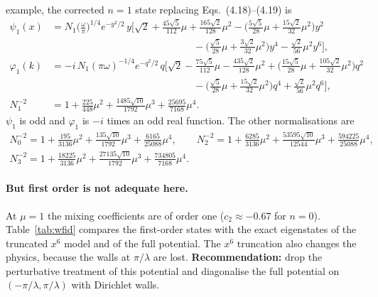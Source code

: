 \documentclass[11pt,a4paper]{article}
\begin{document}
example, the corrected $n=1$ state replacing Eqs.~(4.18)--(4.19) is
\begin{align}
\psi_1(x)&=N_1\Big(\frac\omega\pi\Big)^{1/4}e^{-y^2/2}\,y\Big[\sqrt2+\frac{45\sqrt5}{112}\mu+\frac{165\sqrt2}{128}\mu^2
-\Big(\frac{5\sqrt5}{28}\mu+\frac{15\sqrt2}{32}\mu^2\Big)y^2\nonumber\\
&\hspace{6cm}-\Big(\frac{\sqrt5}{28}\mu+\frac{3\sqrt2}{32}\mu^2\Big)y^4-\frac{\sqrt2}{56}\mu^2y^6\Big],\nonumber\\
\varphi_1(k)&=-i\,N_1(\pi\omega)^{-1/4}e^{-q^2/2}\,q\Big[\sqrt2-\frac{75\sqrt5}{112}\mu-\frac{435\sqrt2}{128}\mu^2
+\Big(\frac{15\sqrt5}{28}\mu+\frac{105\sqrt2}{32}\mu^2\Big)q^2\nonumber\\
&\hspace{6cm}-\Big(\frac{\sqrt5}{28}\mu+\frac{15\sqrt2}{32}\mu^2\Big)q^4+\frac{\sqrt2}{56}\mu^2q^6\Big],\nonumber\\
N_1^{-2}&=1+\frac{225}{448}\mu^2+\frac{1485\sqrt{10}}{1792}\mu^3+\frac{25695}{7168}\mu^4 .
\label{eq:well1}
\end{align}
$\psi_1$ is odd and $\varphi_1$ is $-i$ times an odd real function. The other normalisations are
\begin{gather*}
N_0^{-2}=1+\frac{195}{3136}\mu^2+\frac{135\sqrt{10}}{1792}\mu^3+\frac{6165}{25088}\mu^4,\qquad
N_2^{-2}=1+\frac{6285}{3136}\mu^2+\frac{53595\sqrt{10}}{12544}\mu^3+\frac{594225}{25088}\mu^4,\\
N_3^{-2}=1+\frac{18225}{3136}\mu^2+\frac{27135\sqrt{10}}{1792}\mu^3+\frac{734805}{7168}\mu^4.
\end{gather*}

\paragraph{But first order is not adequate here.} At $\mu=1$ the mixing coefficients are of
order one ($c_2\approx-0.67$ for $n=0$). Table~\ref{tab:wfid} compares the first-order
states with the exact eigenstates of the truncated $x^6$ model and of the full potential.
The $x^6$ truncation also changes the physics, because the walls at $\pi/\lambda$ are lost.
\textbf{Recommendation:} drop the perturbative treatment of this potential and diagonalise
the full potential on $(-\pi/\lambda,\pi/\lambda)$ with Dirichlet walls.
\end{document}
